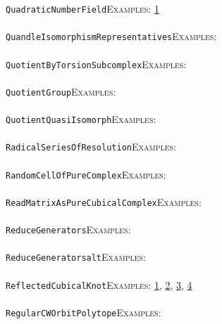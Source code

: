 \documentclass[a4paper,11pt]{report}
\begin{document}
{{ \texttt{QuadraticNumberField}{\nobreakspace}{\nobreakspace}{\nobreakspace}{\nobreakspace}\textsc{Examples:} \href{tutorial/chap10.html} {1}{\nobreakspace} \\
 \\
 \texttt{QuandleIsomorphismRepresentatives}{\nobreakspace}{\nobreakspace}{\nobreakspace}{\nobreakspace}\textsc{Examples:} \\
 \\
 \texttt{QuotientByTorsionSubcomplex}{\nobreakspace}{\nobreakspace}{\nobreakspace}{\nobreakspace}\textsc{Examples:} \\
 \\
 \texttt{QuotientGroup}{\nobreakspace}{\nobreakspace}{\nobreakspace}{\nobreakspace}\textsc{Examples:} \\
 \\
 \texttt{QuotientQuasiIsomorph}{\nobreakspace}{\nobreakspace}{\nobreakspace}{\nobreakspace}\textsc{Examples:} \\
 \\
 \texttt{RadicalSeriesOfResolution}{\nobreakspace}{\nobreakspace}{\nobreakspace}{\nobreakspace}\textsc{Examples:} \\
 \\
 \texttt{RandomCellOfPureComplex}{\nobreakspace}{\nobreakspace}{\nobreakspace}{\nobreakspace}\textsc{Examples:} \\
 \\
 \texttt{ReadMatrixAsPureCubicalComplex}{\nobreakspace}{\nobreakspace}{\nobreakspace}{\nobreakspace}\textsc{Examples:} \\
 \\
 \texttt{ReduceGenerators}{\nobreakspace}{\nobreakspace}{\nobreakspace}{\nobreakspace}\textsc{Examples:} \\
 \\
 \texttt{ReduceGenerators{\textunderscore}alt}{\nobreakspace}{\nobreakspace}{\nobreakspace}{\nobreakspace}\textsc{Examples:} \\
 \\
 \texttt{ReflectedCubicalKnot}{\nobreakspace}{\nobreakspace}{\nobreakspace}{\nobreakspace}\textsc{Examples:} \href{tutorial/chap2.html} {1}{\nobreakspace}, \href{tutorial/chap3.html} {2}{\nobreakspace}, \href{tutorial/chap5.html} {3}{\nobreakspace}, \href{../www/SideLinks/About/aboutCoverinSpaces.html} {4}{\nobreakspace} \\
 \\
 \texttt{RegularCWOrbitPolytope}{\nobreakspace}{\nobreakspace}{\nobreakspace}{\nobreakspace}\textsc{Examples:} \\
}}
\end{document}
